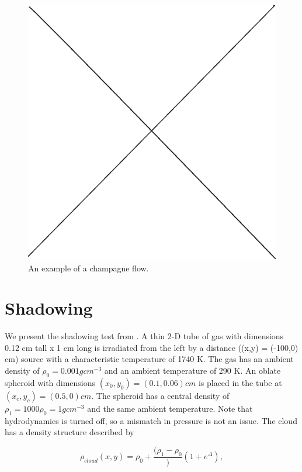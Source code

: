 \begin{figure}
\includegraphics[width=\textwidth]{graphics/placeholder.eps}
\caption[An example of a champagne flow.]{An example of a champagne flow.}
\label{fig:champagne}
\end{figure}

\section{Shadowing}
\label{sec:shadowing}

We present the shadowing test from \citet{hayesNorman03,gonzalezEt07,skinnerOstriker13}. A thin 2-D tube of gas with dimensions 0.12 cm tall x 1 cm long is irradiated from the left by a distance ((x,y) = (-100,0) cm) source with a characteristic temperature of 1740 K. The gas has an ambient density of $\rho_0 = 0.001 g cm^{-3}$ and an ambient temperature of 290 K. An oblate spheroid with dimensions $(x_0,y_0) = (0.1,0.06) cm$ is placed in the tube at $(x_c,y_c) = (0.5,0) cm$. The spheroid has a central density of $\rho_1 = 1000\rho_0 = 1 g cm^{-3}$ and the same ambient temperature. Note that hydrodynamics is turned off, so a mismatch in pressure is not an issue. The cloud has a density structure described by

\begin{equation}
\label{eq:shadowdensity}
\rho_{cloud}(x,y) = \rho_0 + \frac{(\rho_1 - \rho_0}){(1+e^{\Delta})},
\end{equation}

